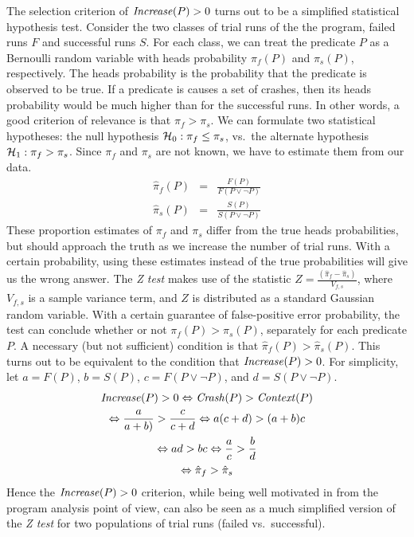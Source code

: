 The selection criterion of $\mbox{\textit{Increase}}(P) > 0$ turns out to be a simplified
statistical hypothesis test.  Consider the two classes of trial runs
of the the program, failed runs $F$ and successful runs $S$.  For each
class, we can treat the predicate $P$ as a Bernoulli random variable
with heads probability $\pi_f(P)$ and $\pi_s(P)$, respectively.  The heads
probability is the probability that the predicate is observed to be
true.  If a predicate is causes a set of crashes, then its heads
probability would be much higher than for the successful runs.  In
other words, a good criterion of relevance is that $\pi_f > \pi_s$.  We
can formulate two statistical hypotheses: the null hypothesis ${\mathcal{H}}_0:
\pi_f \leq \pi_s$, vs.\ the alternate hypothesis ${\mathcal{H}}_1: \pi_f > \pi_s$.  Since
$\pi_f$ and $\pi_s$ are not known, we have to estimate them from our
data.
\begin{eqnarray}
  \hat \pi_f(P) &=& \frac{F(P)}{F(P \lor \lnot P)} \\
  \hat \pi_s(P) &=& \frac{S(P)}{S(P \lor \lnot P)}
\end{eqnarray}
These proportion estimates of $\pi_f$ and $\pi_s$ differ from the true
heads probabilities, but should approach the truth as we increase the
number of trial runs.  With a certain probability, using these
estimates instead of the true probabilities will give us the wrong
answer.  The \textit{Z test} makes use of the statistic $ Z =
\frac{(\hat \pi_f - \hat \pi_s)}{V_{f,s}}$, where $V_{f,s}$ is a sample
variance term, and $Z$ is distributed as a standard Gaussian random
variable.  With a certain guarantee of false-positive error
probability, the test can conclude whether or not $\pi_f(P) > \pi_s(P)$,
separately for each predicate $P$.  A necessary (but not sufficient)
condition is that $\hat \pi_f(P) > \hat \pi_s(P)$.  This turns out to be
equivalent to the condition that $\mbox{\textit{Increase}}(P) > 0$.  For simplicity,
let $a = F(P)$, $b = S(P)$, $c = F(P\lor\lnot P)$, and $d = S(P\lor\lnot P)$.
\begin{gather*}
  \mbox{\textit{Increase}}(P) > 0 \Leftrightarrow \mbox{\textit{Crash}}(P) > \mbox{\textit{Context}}(P) \\
  \Leftrightarrow \frac{a}{a+b)} > \frac{c}{c+d}
  \Leftrightarrow a (c+d) > (a+b) c \\
  \Leftrightarrow ad > bc \Leftrightarrow \frac{a}{c} > \frac{b}{d} \\
  \Leftrightarrow \hat \pi_f > \hat \pi_s
\end{gather*}
Hence the $\mbox{\textit{Increase}}(P) > 0$ criterion, while being well motivated in
from the program analysis point of view, can also be seen as a much
simplified version of the \textit{Z test} for two populations of trial
runs (failed vs.\ successful).

